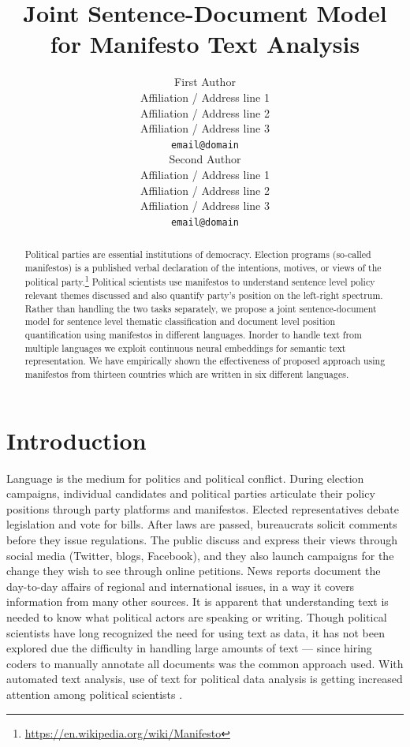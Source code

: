 \documentclass[11pt,a4paper]{article}
\title{Joint Sentence-Document Model for Manifesto Text Analysis}
\author{First Author \\
  Affiliation / Address line 1 \\
  Affiliation / Address line 2 \\
  Affiliation / Address line 3 \\
  {\tt email@domain} \\\And
  Second Author \\
  Affiliation / Address line 1 \\
  Affiliation / Address line 2 \\
  Affiliation / Address line 3 \\
  {\tt email@domain} \\}
\date{}
\begin{document}
\maketitle
\begin{abstract}
Political parties are essential institutions of democracy. Election programs (so-called manifestos) is a published verbal declaration of the intentions, motives, or views of the political party.\footnote{\url{https://en.wikipedia.org/wiki/Manifesto}} Political scientists use manifestos to understand sentence level policy relevant themes discussed and also quantify party's position on the left-right spectrum. Rather than handling the two tasks separately, we propose a joint sentence-document model for sentence level thematic classification and document level position quantification using manifestos in different languages. Inorder to handle text from multiple languages we exploit continuous neural embeddings for semantic text representation. We have empirically shown the effectiveness of proposed approach using manifestos from thirteen countries which are written in six different languages.
\end{abstract}

\section{Introduction}

Language is the medium for politics and political conflict. During election campaigns, individual candidates and political parties articulate their policy positions through party platforms and manifestos. Elected representatives debate legislation and vote for bills. After laws are passed, bureaucrats solicit comments before they issue regulations. The public discuss and express their views through social media (Twitter, blogs, Facebook), and they also launch campaigns for the change they wish to see through online petitions.  News reports document the day-to-day affairs of regional and international issues, in a way it covers information from many other sources.  It is apparent that understanding text is needed to know what political actors are speaking or writing. Though political scientists have long recognized the need for using text as data, it has not been explored due the difficulty in handling large amounts of text --- since hiring coders to manually annotate all documents was the common approach used. With automated text analysis, use of text for political data analysis is getting increased attention among political scientists \cite{ruedin2013role, gentzkow2017text}.
\end{document}
